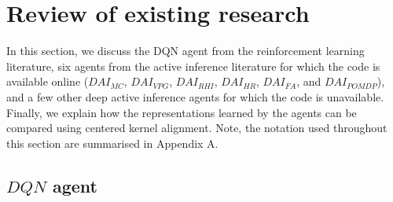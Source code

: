 \documentclass[twoside,11pt]{article}
\begin{document}
\section{Review of existing research} \label{sec:existing_research}

In this section, we discuss the DQN agent from the reinforcement learning literature, six agents from the active inference literature for which the code is available online ($DAI_{MC}$, $DAI_{VPG}$, $DAI_{RHI}$, $DAI_{HR}$, $DAI_{FA}$, and $DAI_{POMDP}$), and a few other deep active inference agents for which the code is unavailable. Finally, we explain how the representations learned by the agents can be compared using centered kernel alignment. Note, the notation used throughout this section are summarised in Appendix A.

\subsection{$DQN$ agent \citep{DeepRL}} \label{ssec:dqn}
\end{document}
